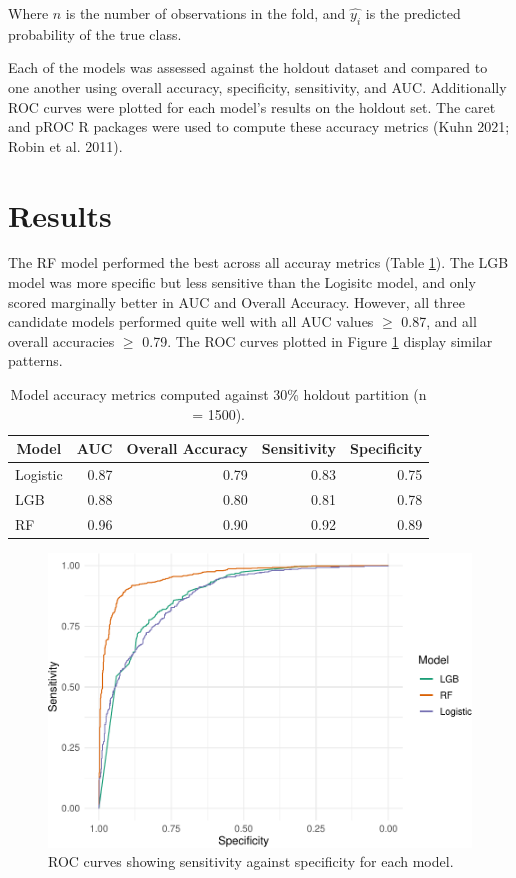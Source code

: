 \documentclass[]{elsarticle} %
\begin{document}
Where \(n\) is the number of observations in the fold, and \(\hat{y_i}\) is
the predicted probability of the true class.

Each of the models was assessed against the holdout dataset and compared to one
another using overall accuracy, specificity, sensitivity, and AUC.
Additionally ROC curves were plotted for each model's results on the holdout
set.
The caret and pROC R packages were used to compute these accuracy metrics
(Kuhn 2021; Robin et al. 2011).

\hypertarget{results}{%
\section{Results}\label{results}}

The RF model performed the best across all accuray metrics (Table \ref{tab:metrics}).
The LGB model was more specific but less sensitive than the Logisitc
model, and only scored marginally better in AUC and Overall Accuracy.
However, all three candidate models performed quite well with
all AUC values \(\geq\) 0.87, and all overall accuracies \(\geq\) 0.79.
The ROC curves plotted in Figure \ref{fig:roc} display similar patterns.

\begin{table}

\caption{\label{tab:metrics}Model accuracy metrics computed against 30\% holdout partition (n = 1500).}
\centering
\fontsize{12}{14}\selectfont
\begin{tabular}[t]{lrrrr}
\toprule
\multicolumn{1}{c}{Model} & \multicolumn{1}{c}{AUC} & \multicolumn{1}{c}{Overall Accuracy} & \multicolumn{1}{c}{Sensitivity} & \multicolumn{1}{c}{Specificity}\\
\midrule
Logistic & 0.87 & 0.79 & 0.83 & 0.75\\
\addlinespace
LGB & 0.88 & 0.80 & 0.81 & 0.78\\
\addlinespace
RF & 0.96 & 0.90 & 0.92 & 0.89\\
\bottomrule
\end{tabular}
\end{table}

\begin{figure}
\centering
\includegraphics{report_files/figure-latex/roc-1.pdf}
\caption{\label{fig:roc}ROC curves showing sensitivity against specificity for each model.}
\end{figure}
\end{document}
